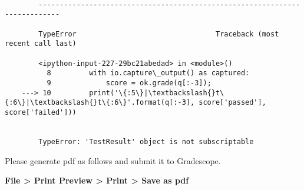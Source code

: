 \documentclass[11pt]{article}
\begin{document}
    \begin{Verbatim}[commandchars=\\\{\}]

        ---------------------------------------------------------------------------

        TypeError                                 Traceback (most recent call last)

        <ipython-input-227-29bc21abedad> in <module>()
          8         with io.capture\_output() as captured:
          9             score = ok.grade(q[:-3]);
    ---> 10         print('\{:5\}|\textbackslash{}t\{:6\}|\textbackslash{}t\{:6\}'.format(q[:-3], score['passed'], score['failed']))
    

        TypeError: 'TestResult' object is not subscriptable

    \end{Verbatim}

    Please generate pdf as follows and submit it to Gradescope.

\textbf{File \textgreater{} Print Preview \textgreater{} Print
\textgreater{} Save as pdf}


    
    
    
    
\end{document}
